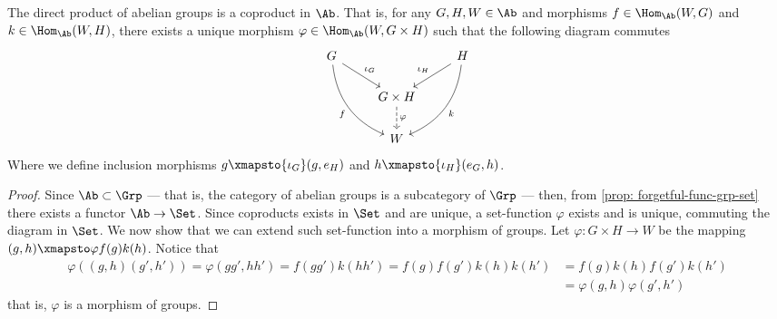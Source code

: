 \begin{proposition}[Coproduct in \(\Ab\)]\label{prop: coprod-ab}
The direct product of abelian groups is a coproduct in \(\Ab\). That is, for any
\(G, H, W \in \Ab\) and morphisms \(f \in \Hom_\Ab(W, G)\) and
\(k \in \Hom_\Ab(W, H)\), there exists a unique morphism
\(\varphi \in \Hom_\Ab(W, G \times H)\) such that the following diagram commutes
\[
  \begin{tikzcd}
    G \ar[dr, "\iota_G"] \ar[ddr, bend right, swap, "f"] &
    &H \ar[dl, swap, "\iota_H"] \ar[ddl, bend left, "k"] \\
    &G \times H \ar[d, dashed, "\varphi"]  & \\
    &W &
  \end{tikzcd}
\]
Where we define inclusion morphisms \(g \xmapsto{\iota_G} (g, e_H)\) and \(h
\xmapsto{\iota_H} (e_G, h)\).
\end{proposition}

\begin{proof}
Since \(\Ab \subset \Grp\) --- that is, the category of abelian groups is a
subcategory of \(\Grp\) --- then, from \cref{prop: forgetful-func-grp-set}
there exists a functor \(\Ab \to \Set\). Since coproducts exists in \(\Set\)
and are unique, a set-function \(\varphi\) exists and is unique, commuting the
diagram in \(\Set\). We now show that we can extend such set-function into a
morphism of groups. Let \(\varphi: G \times H \to W\) be the mapping \((g, h)
\xmapsto \varphi f(g) k(h)\). Notice that
\begin{align*}
  \varphi((g, h)(g', h'))
  = \varphi(gg', hh')
  = f(g g') k(hh')
  = f(g) f(g') k(h) k(h')
  &= f(g) k(h) f(g') k(h') \\
  &= \varphi(g, h) \varphi(g', h')
\end{align*}
that is, \(\varphi\) is a morphism of groups.
\end{proof}


